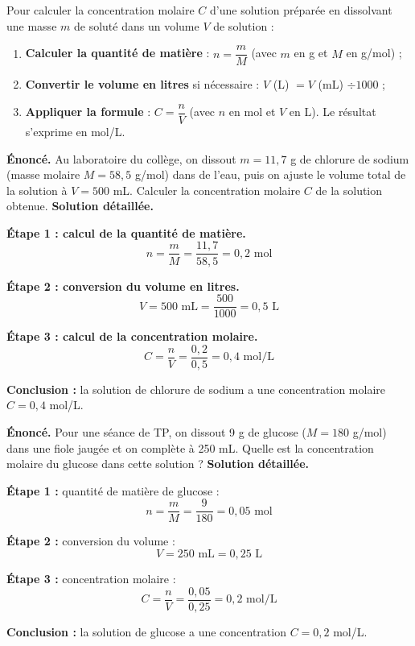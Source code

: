 \documentclass[11pt]{article}
\begin{document}
\begin{methode}
Pour calculer la concentration molaire $C$ d'une solution préparée en dissolvant une masse $m$ de soluté dans un volume $V$ de solution :
\begin{enumerate}
\item \textbf{Calculer la quantité de matière} : $n = \dfrac{m}{M}$ (avec $m$ en g et $M$ en g/mol) ;
\item \textbf{Convertir le volume en litres} si nécessaire : $V$ (L) $= V$ (mL) $\div 1000$ ;
\item \textbf{Appliquer la formule} : $C = \dfrac{n}{V}$ (avec $n$ en mol et $V$ en L). Le résultat s'exprime en mol/L.
\end{enumerate}
\end{methode}

\begin{exoresolu}
\textbf{Énoncé.} Au laboratoire du collège, on dissout $m = 11,7$ g de chlorure de sodium  (masse molaire $M = 58,5$ g/mol) dans de l'eau, puis on ajuste le volume total de la solution à $V = 500$ mL. Calculer la concentration molaire $C$ de la solution obtenue.
\tcblower
\textbf{Solution détaillée.}

\textbf{Étape 1 : calcul de la quantité de matière.}
\[ n = \frac{m}{M} = \frac{11,7}{58,5} = 0,2 \text{ mol} \]

\textbf{Étape 2 : conversion du volume en litres.}
\[ V = 500 \text{ mL} = \frac{500}{1000} = 0,5 \text{ L} \]

\textbf{Étape 3 : calcul de la concentration molaire.}
\[ C = \frac{n}{V} = \frac{0,2}{0,5} = 0,4 \text{ mol/L} \]

\textbf{Conclusion :} la solution de chlorure de sodium a une concentration molaire $C = 0,4$ mol/L.
\end{exoresolu}

\begin{exoresolu}
\textbf{Énoncé.} Pour une séance de TP, on dissout 9 g de glucose  ($M = 180$ g/mol) dans une fiole jaugée et on complète à 250 mL. Quelle est la concentration molaire du glucose dans cette solution ?
\tcblower
\textbf{Solution détaillée.}

\textbf{Étape 1 :} quantité de matière de glucose :
\[ n = \frac{m}{M} = \frac{9}{180} = 0,05 \text{ mol} \]

\textbf{Étape 2 :} conversion du volume :
\[ V = 250 \text{ mL} = 0,25 \text{ L} \]

\textbf{Étape 3 :} concentration molaire :
\[ C = \frac{n}{V} = \frac{0,05}{0,25} = 0,2 \text{ mol/L} \]

\textbf{Conclusion :} la solution de glucose a une concentration $C = 0,2$ mol/L.
\end{exoresolu}
\end{document}
